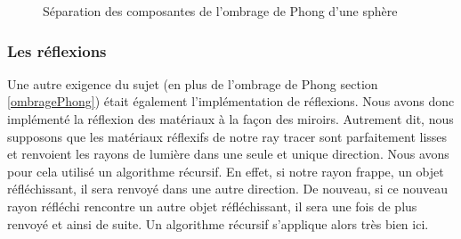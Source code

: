 \documentclass[11pt]{article}
\begin{document}
\begin{figure}[h!]

	\caption{Séparation des composantes de l'ombrage de Phong d'une sphère}
	\label{finalPhong}
\end{figure}
\FloatBarrier

\subsubsection{Les réflexions}
Une autre exigence du sujet (en plus de l'ombrage de Phong section \ref{ombragePhong}) était également l'implémentation de réflexions. Nous avons donc implémenté la réflexion des matériaux à la façon des miroirs. Autrement dit, nous supposons que les matériaux réflexifs de notre ray tracer sont parfaitement lisses et renvoient les rayons de lumière dans une seule et unique direction. Nous avons pour cela utilisé un algorithme récursif. En effet, si notre rayon frappe, un objet réfléchissant, il sera renvoyé dans une autre direction. De nouveau, si ce nouveau rayon réfléchi rencontre un autre objet réfléchissant, il sera une fois de plus renvoyé et ainsi de suite. Un algorithme récursif s'applique alors très bien ici.
\end{document}
